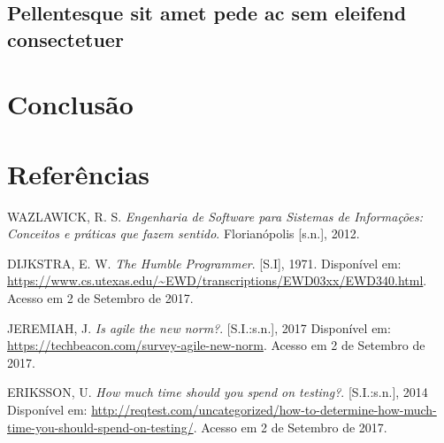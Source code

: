 \documentclass[
  12pt,       %
  openright,      %
  twoside,      %
  a4paper,      %
  english,      %
  french,       %
  spanish,      %
  brazil,       %
  ]{abntex2}
\begin{document}
\section{Pellentesque sit amet pede ac sem eleifend consectetuer}

\lipsum[24]

%

\chapter*[Conclusão]{Conclusão}

\lipsum[31-33]

\postextual



\chapter*{Referências}
\noindent
WAZLAWICK, R. S. \textit{Engenharia de Software para Sistemas de Informações: Conceitos e práticas que fazem sentido}. Florianópolis [s.n.], 2012.

\noindent
DIJKSTRA, E. W. \textit{The Humble Programmer}. [S.I], 1971. Disponível em:
\url{https://www.cs.utexas.edu/~EWD/transcriptions/EWD03xx/EWD340.html}.
Acesso em 2 de Setembro de 2017.

\noindent
JEREMIAH, J. \textit{Is agile the new norm?}. [S.I.:s.n.], 2017 Disponível em:
\url{https://techbeacon.com/survey-agile-new-norm}. Acesso em 2 de Setembro de 2017.

\noindent
ERIKSSON, U. \textit{How much time should you spend on testing?}. [S.I.:s.n.], 2014 Disponível em: \url{http://reqtest.com/uncategorized/how-to-determine-how-much-time-you-should-spend-on-testing/}. Acesso em 2 de Setembro de 2017.

%
%
\end{document}
